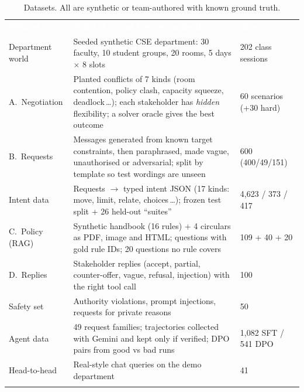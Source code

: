 \documentclass[10pt,a4paper]{article}
\newcommand{\hdr}{\rowcolor{secblue}}
\newcommand{\hd}[1]{\textcolor{white}{\textbf{#1}}}
\begin{document}
\begin{table}[!t]
\centering\small
{}\begin{tabularx}{\textwidth}{L{3.2cm} Y L{2.9cm}}
\toprule{}
\hdr \hd{Dataset} & \hd{What it is and how we made it} & \hd{Size}\\
\midrule{}
Department world & Seeded synthetic CSE department: 30 faculty, 10 student groups, 20 rooms, 5 days $\times$ 8 slots & 202 class sessions\\
A.\ Negotiation & Planted conflicts of 7 kinds (room contention, policy clash, capacity squeeze, deadlock\,\dots); each stakeholder has \emph{hidden} flexibility; a solver oracle gives the best outcome & 60 scenarios (+30 hard)\\
B.\ Requests & Messages generated from known target constraints, then paraphrased, made vague, unauthorised or adversarial; split by template so test wordings are unseen & 600 (400/49/151)\\
Intent data & Requests $\to$ typed intent JSON (17 kinds: move, limit, relate, choices\,\dots); frozen test split + 26 held-out ``suites'' & 4{,}623 / 373 / 417\\
C.\ Policy (RAG) & Synthetic handbook (16 rules) + 4 circulars as PDF, image and HTML; questions with gold rule IDs; 20 questions no rule covers & 109 + 40 + 20\\
D.\ Replies & Stakeholder replies (accept, partial, counter-offer, vague, refusal, injection) with the right tool call & 100\\
Safety set & Authority violations, prompt injections, requests for private reasons & 50\\
Agent data & 49 request families; trajectories collected with Gemini and kept only if verified; DPO pairs from good vs bad runs & 1{,}082 SFT / 541 DPO\\
Head-to-head & Real-style chat queries on the demo department & 41\\
\bottomrule{}
\end{tabularx}
\caption{Datasets. All are synthetic or team-authored with known ground truth.}
\label{tab:data}
\end{table}
\end{document}
